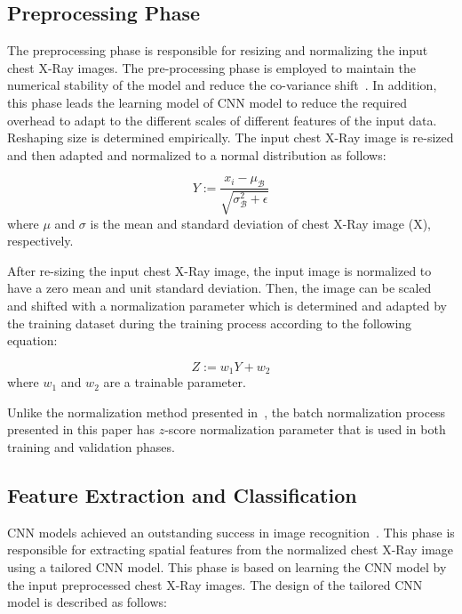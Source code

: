 \subsection{Preprocessing Phase}

The preprocessing phase is responsible for resizing and normalizing the  input  chest X-Ray images. The pre-processing phase is employed to maintain the numerical stability of the model and reduce the co-variance shift~\cite{lecun1989handwritten}. In addition, this phase leads the learning model of CNN model to reduce  the required overhead to adapt to the different scales of different features of the input data. Reshaping size is determined empirically. The input chest X-Ray image is re-sized and then adapted and normalized to a normal distribution as follows:

\begin{equation}
Y := \frac{x_i - \mu_{\mathcal B}}{\sqrt{\sigma_{\mathcal B}^2 + \epsilon}}
\label{eq1}
\end{equation}
where $\mu$ and $\sigma$ is the mean and standard deviation of chest X-Ray image (X), respectively.

After re-sizing the input chest X-Ray image, the input image is normalized to have a zero mean and unit standard deviation. Then,  the image can be scaled and shifted with a normalization parameter which is determined and adapted by the training dataset during the training process according to the following equation: 

\begin{equation}
Z := w_1 Y + w_2
\label{eq2}
\end{equation}
where $w_1$ and $w_2$ are a trainable parameter.

Unlike the  normalization method presented in~\cite{ioffe2015batch}, the batch normalization process presented in this paper has $z$-score normalization parameter that is used in both training and validation phases.


\subsection{Feature Extraction and Classification}

CNN models achieved an outstanding success in image recognition~\cite{lecun2015deep}. This phase  is responsible for extracting spatial features from the normalized chest X-Ray image using a tailored CNN model.  This phase is based on learning the CNN model by the input preprocessed chest X-Ray images. The design of the tailored CNN model is described as follows: 

